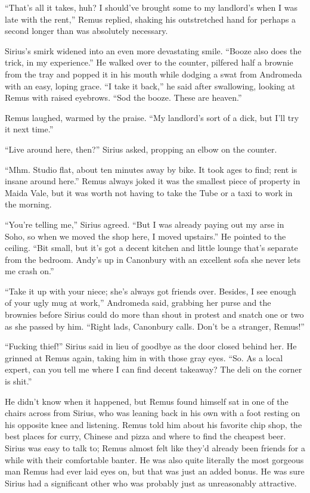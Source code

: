 “That’s all it takes, huh? I should’ve brought some to my landlord’s when I was late with the rent,” Remus replied, shaking his outstretched hand for perhaps a second longer than was absolutely necessary.

Sirius’s smirk widened into an even more devastating smile. “Booze also does the trick, in my experience.” He walked over to the counter, pilfered half a brownie from the tray and popped it in his mouth while dodging a swat from Andromeda with an easy, loping grace. “I take it back,” he said after swallowing, looking at Remus with raised eyebrows. “Sod the booze. These are heaven.”

Remus laughed, warmed by the praise. “My landlord’s sort of a dick, but I’ll try it next time.”

“Live around here, then?” Sirius asked, propping an elbow on the counter.

“Mhm. Studio flat, about ten minutes away by bike. It took ages to find; rent is insane around here.” Remus always joked it was the smallest piece of property in Maida Vale, but it was worth not having to take the Tube or a taxi to work in the morning.

“You’re telling me,” Sirius agreed. “But I was already paying out my arse in Soho, so when we moved the shop here, I moved upstairs.” He pointed to the ceiling. “Bit small, but it’s got a decent kitchen and little lounge that’s separate from the bedroom. Andy’s up in Canonbury with an excellent sofa she never lets me crash on.”

“Take it up with your niece; she’s always got friends over. Besides, I see enough of your ugly mug at work,” Andromeda said, grabbing her purse and the brownies before Sirius could do more than shout in protest and snatch one or two as she passed by him. “Right lads, Canonbury calls. Don’t be a stranger, Remus!”

“Fucking thief!” Sirius said in lieu of goodbye as the door closed behind her. He grinned at Remus again, taking him in with those gray eyes. “So. As a local expert, can you tell me where I can find decent takeaway? The deli on the corner is shit.”

He didn’t know when it happened, but Remus found himself sat in one of the chairs across from Sirius, who was leaning back in his own with a foot resting on his opposite knee and listening. Remus told him about his favorite chip shop, the best places for curry, Chinese and pizza and where to find the cheapest beer. Sirius was easy to talk to; Remus almost felt like they’d already been friends for a while with their comfortable banter. He was also quite literally the most gorgeous man Remus had ever laid eyes on, but that was just an added bonus. He was sure Sirius had a significant other who was probably just as unreasonably attractive.

